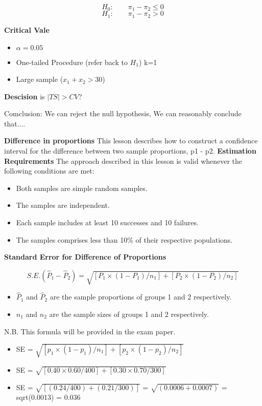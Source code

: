 \documentclass[]{report}
\begin{document}
\[H_0 : \qquad \pi_1 - \pi_2  \leq 0  \]
\[H_1 : \qquad \pi_1 - \pi_2 > 0   \]


\textbf{Critical Vale}
\begin{itemize}
\item $\alpha = 0.05$
\item One-tailed Procedure (refer back to $H_1$) k=1
\item Large sample ($x_1+x_2 > 30$)
\end{itemize}

\textbf{Descision}
is $|TS| > CV$?

Comclusion: We can reject the null hypothesis, We can reasonably conclude that....



\newpage




\textbf{Difference in proportions}
This lesson describes how to construct a confidence interval for the difference between two sample proportions, p1 - p2.
\textbf{Estimation Requirements}
The approach described in this lesson is valid whenever the following conditions are met:

\begin{itemize}
	\item Both samples are simple random samples.
	\item The samples are independent.
	\item Each sample includes at least 10 successes and 10 failures.
	\item The samples comprises less than 10\% of their respective populations.
\end{itemize}




\textbf{Standard Error for Difference of Proportions}

\[S.E. (\hat{P}_1 - \hat{P}_2)  = \sqrt{ [P_1 \times (1 - P_1) / n_1] + [P_2 \times (1 - P_2) / n_2] } \] 
\begin{itemize}
	\item $\hat{P}_1$ and $\hat{P}_2$ are the sample proportions of groups 1 and 2 respectively.
	\item $n_1$ and $n_2$ are the sample sizes of groups 1 and 2 respectively.
\end{itemize}
N.B. This formula will be provided in the exam paper.




\begin{itemize}
	\item SE = $\sqrt{ [p_1 \times (1 - p_1) / n_1] + [p_2 \times (1 - p_2) / n_2] } $
	\item SE = $\sqrt{ [0.40 \times 0.60 / 400] + [0.30 \times 0.70 / 300] } $
	\item SE  = $\sqrt{[ (0.24 / 400) + (0.21 / 300) ]}$ = $\sqrt{(0.0006 + 0.0007)}$ = sqrt(0.0013) = 0.036 
\end{itemize}
\end{document}
